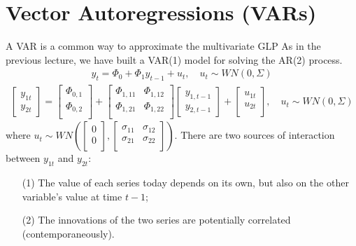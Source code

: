 \section{Vector Autoregressions (VARs)}\label{sec:VAR}
A VAR is a common way to approximate the multivariate GLP
As in the previous lecture, we have built a VAR(1) model for solving the AR(2) process.
\begin{gather*}
    y_t = \Phi_0 + \Phi_1 y_{t-1} + u_t, \quad u_t \sim WN(0, \Sigma)
\end{gather*}
\begin{gather*}
    \begin{bmatrix}
        y_{1t} \\
        y_{2t}
    \end{bmatrix} = \begin{bmatrix}
         \Phi_{0,1} \\
         \Phi_{0,2} \\
    \end{bmatrix} + \begin{bmatrix}
        \Phi_{1,11} & \Phi_{1,12}  \\
        \Phi_{1,21} & \Phi_{1,22}  \\
    \end{bmatrix}
    \begin{bmatrix}
        y_{1,t-1} \\
        y_{2,t-1}
    \end{bmatrix} + \begin{bmatrix}
         u_{1t} \\
         u_{2t} \\
    \end{bmatrix}, \quad u_t \sim WN(0, \Sigma)
\end{gather*}
where $u_t \sim  WN\left( \begin{bmatrix}
     0 \\
     0 \\
\end{bmatrix}, \begin{bmatrix}
    \sigma_{11} & \sigma_{12} \\
    \sigma_{21} & \sigma_{22} \\
\end{bmatrix} \right)$.
There are two sources of interaction between $y_{1t}$ and $y_{2t}$:
\begin{enumerate}
    \item[(1)] The value of each series today depends on its own, but also on the other variable's value at time $t-1$;
    \item[(2)] The innovations of the two series are potentially correlated (contemporaneously).
\end{enumerate}
